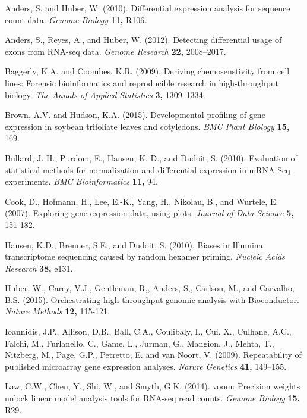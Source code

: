 \documentclass[useAMS,referee]{biom}
\begin{document}
\begin{thebibliography}{}

\bibitem{ } Anders, S. and Huber, W. (2010). Differential expression analysis for sequence count data. \textit{Genome Biology} \textbf{11,} R106.

\bibitem{ } Anders, S., Reyes, A., and Huber, W. (2012). Detecting differential usage of exons from RNA-seq data. \textit{Genome Research} \textbf{22,} 2008–2017.

\bibitem{ } Baggerly, K.A. and Coombes, K.R. (2009). Deriving chemosenstivity from cell lines: Forensic bioinformatics and reproducible research in high-throughput biology. \textit{The Annals of Applied Statistics} \textbf{3,} 1309–1334.

\bibitem{ } Brown, A.V. and Hudson, K.A. (2015). Developmental profiling of gene expression in soybean trifoliate leaves and cotyledons. \textit{BMC Plant Biology} \textbf{15,} 169.

\bibitem{ } Bullard, J. H., Purdom, E., Hansen, K. D., and Dudoit, S. (2010). Evaluation of statistical methods for normalization and differential expression in mRNA-Seq experiments. \textit{BMC Bioinformatics} \textbf{11,} 94.

\bibitem{ } Cook, D., Hofmann, H., Lee, E.-K., Yang, H., Nikolau, B., and Wurtele, E. (2007). Exploring gene expression data, using plots. \textit{Journal of Data Science} \textbf{5,} 151-182.

\bibitem{ } Hansen, K.D., Brenner, S.E., and Dudoit, S. (2010). Biases in Illumina transcriptome sequencing caused by random hexamer priming. \textit{Nucleic Acids Research} \textbf{38,} e131.

\bibitem{ } Huber, W., Carey, V.J., Gentleman, R,, Anders, S,, Carlson, M., and Carvalho, B.S. (2015). Orchestrating high-throughput genomic analysis with Bioconductor. \textit{Nature Methods} \textbf{12,} 115-121.

\bibitem{ } Ioannidis, J.P., Allison, D.B., Ball, C.A., Coulibaly, I., Cui, X., Culhane, A.C., Falchi, M., Furlanello, C., Game, L., Jurman, G., Mangion, J., Mehta, T., Nitzberg, M., Page, G.P., Petretto, E. and van Noort, V. (2009). Repeatability of published microarray gene expression analyses. \textit{Nature Genetics} \textbf{41,} 149–155.

\bibitem{ } Law, C.W., Chen, Y., Shi, W., and Smyth, G.K. (2014). voom: Precision weights unlock linear model analysis tools for RNA-seq read counts. \textit{Genome Biology} \textbf{15,} R29.


\end{thebibliography}
\end{document}
